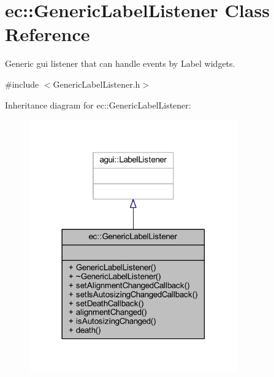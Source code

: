 \hypertarget{classec_1_1_generic_label_listener}{}\section{ec\+:\+:Generic\+Label\+Listener Class Reference}
\label{classec_1_1_generic_label_listener}


Generic gui listener that can handle events by Label widgets.  




{\ttfamily \#include $<$Generic\+Label\+Listener.\+h$>$}



Inheritance diagram for ec\+:\+:Generic\+Label\+Listener\+:\nopagebreak
\begin{figure}[H]
\begin{center}
\leavevmode
\includegraphics[width=254pt]{classec_1_1_generic_label_listener__inherit__graph}
\end{center}
\end{figure}


